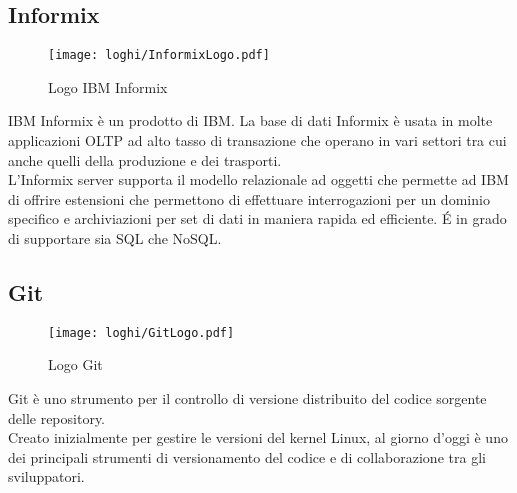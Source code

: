 \subsection*{Informix}
\begin{figure}[!h] 
    \centering 
    \texttt{[image: loghi/InformixLogo.pdf]}
    \caption{Logo IBM Informix}
\end{figure}
\noindent IBM Informix è un prodotto di IBM. La base di dati Informix è usata in molte
applicazioni OLTP ad alto tasso di transazione che operano in vari settori tra cui anche quelli della produzione e dei trasporti.\\
L’Informix server supporta il modello relazionale ad oggetti che permette ad IBM di
offrire estensioni che permettono di effettuare interrogazioni per un dominio specifico
e archiviazioni per set di dati in maniera rapida ed efficiente.
É in grado di supportare sia SQL che NoSQL.

\subsection*{Git}
\begin{figure}[!h] 
    \centering 
    \texttt{[image: loghi/GitLogo.pdf]}
    \caption{Logo Git}
\end{figure}
\noindent Git è uno strumento per il controllo di versione distribuito del codice sorgente delle repository.\\
Creato inizialmente per gestire le versioni del kernel Linux, al giorno d'oggi è uno dei principali
strumenti di versionamento del codice e di collaborazione tra gli sviluppatori.